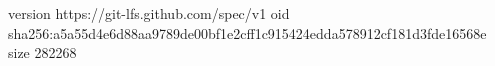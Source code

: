 version https://git-lfs.github.com/spec/v1
oid sha256:a5a55d4e6d88aa9789de00bf1e2cff1c915424edda578912cf181d3fde16568e
size 282268
